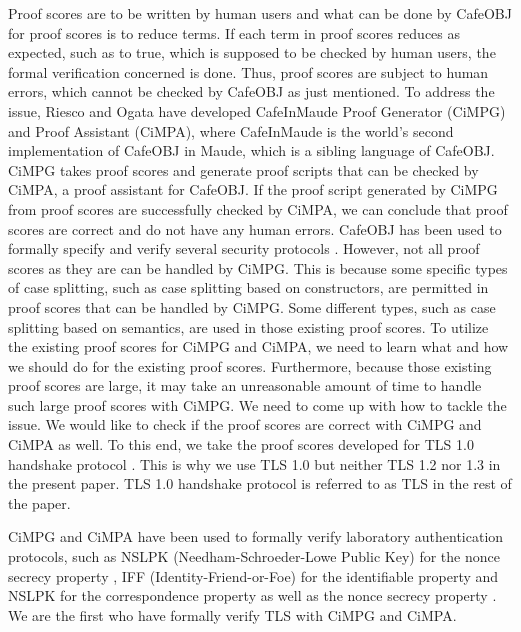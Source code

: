 \documentclass[a4paper,fleqn]{cas-dc}
\begin{document}
Proof scores are to be written by human users and what can be done by CafeOBJ for proof scores is to reduce terms. If each term in proof scores reduces as expected, such as to true, which is supposed to be checked by human users, the formal verification concerned is done. Thus, proof scores are subject to human errors, which cannot be checked by CafeOBJ as just mentioned. To address the issue, Riesco and Ogata \cite{RiescoO18tosem} have developed CafeInMaude Proof Generator (CiMPG) and Proof Assistant (CiMPA), where CafeInMaude is the world's second implementation of CafeOBJ in Maude, which is a sibling language of CafeOBJ. CiMPG takes proof scores and generate proof scripts that can be checked by CiMPA, a proof assistant for CafeOBJ. If the proof script generated by CiMPG from proof scores are successfully checked by CiMPA, we can conclude that proof scores are correct and do not have any human errors. CafeOBJ has been used to formally specify and verify several security protocols \cite{10.5555/1765533.1765569, 10.5555/646542.696196, 1357944, 1437139}. However, not all proof scores as they are can be handled by CiMPG. This is because some specific types of case splitting, such as case splitting based on constructors, are permitted in proof scores that can be handled by CiMPG. Some different types, such as case splitting based on semantics, are used in those existing proof scores. To utilize the existing proof scores for CiMPG and CiMPA, we need to learn what and how we should do for the existing proof scores. Furthermore, because those existing proof scores are large, it may take an unreasonable amount of time to handle such large proof scores with CiMPG. We need to come up with how to tackle the issue. We would like to check if the proof scores are correct with CiMPG and CiMPA as well. To this end, we take the proof scores developed for TLS 1.0 handshake protocol \cite{1437139}. This is why we use TLS 1.0 but neither TLS 1.2 nor 1.3 in the present paper. TLS 1.0 handshake protocol is referred to as TLS in the rest of the paper.

CiMPG and CiMPA have been used to formally verify laboratory authentication protocols, such as NSLPK (Needham-Schroeder-Lowe Public Key) for the nonce secrecy property \cite{RiescoO18tosem}, IFF (Identity-Friend-or-Foe) for the identifiable property \cite{twmon} and NSLPK for the correspondence property as well as the nonce secrecy property \cite{twmon}. We are the first who have formally verify TLS with CiMPG and CiMPA.
\end{document}
